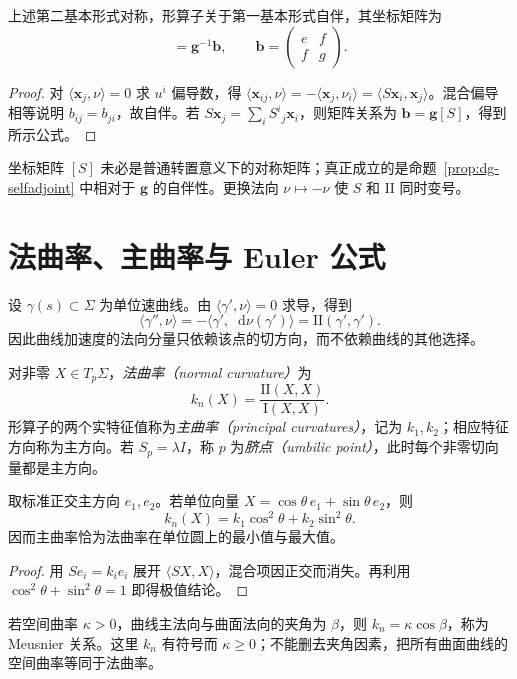 \documentclass[UTF8,12pt,a4paper,fontset=fandol]{ctexbook}
\newcommand{\dd}{\mathop{}\!\mathrm d}
\newcommand{\ip}[2]{\langle #1,#2\rangle}
\begin{document}
\begin{proposition}[形算子的自伴性]
上述第二基本形式对称，形算子关于第一基本形式自伴，其坐标矩阵为
\begin{equation}
 [S]=\mathbf g^{-1}\mathbf b,\qquad
 \mathbf b=\begin{pmatrix}e&f\\f&g\end{pmatrix}.
 \label{eq:dg-shape-matrix}
\end{equation}
\end{proposition}
\begin{proof}
对 $\ip{\mathbf x_j}\nu=0$ 求 $u^i$ 偏导数，得 $\ip{\mathbf x_{ij}}\nu=-\ip{\mathbf x_j}{\nu_i}=\ip{S\mathbf x_i}{\mathbf x_j}$。混合偏导相等说明 $b_{ij}=b_{ji}$，故自伴。若 $S\mathbf x_j=\sum_iS^i{}_j\mathbf x_i$，则矩阵关系为 $\mathbf b=\mathbf g[S]$，得到所示公式。
\end{proof}
坐标矩阵 $[S]$ 未必是普通转置意义下的对称矩阵；真正成立的是命题~\ref{prop:dg-selfadjoint} 中相对于 $\mathbf g$ 的自伴性。更换法向 $\nu\mapsto-\nu$ 使 $S$ 和 $\mathrm{II}$ 同时变号。

\section{法曲率、主曲率与 Euler 公式}
设 $\gamma(s)\subset\Sigma$ 为单位速曲线。由 $\ip{\gamma'}\nu=0$ 求导，得到
\[
 \ip{\gamma''}\nu=-\ip{\gamma'}{\dd\nu(\gamma')}
 =\mathrm{II}(\gamma',\gamma').
\]
因此曲线加速度的法向分量只依赖该点的切方向，而不依赖曲线的其他选择。

\begin{definition}[法曲率与主曲率]
对非零 $X\in T_p\Sigma$，\emph{法曲率（normal curvature）}为
\[
 k_n(X)=\frac{\mathrm{II}(X,X)}{\mathrm I(X,X)}.
\]
形算子的两个实特征值称为\emph{主曲率（principal curvatures）}，记为 $k_1,k_2$；相应特征方向称为主方向。若 $S_p=\lambda I$，称 $p$ 为\emph{脐点（umbilic point）}，此时每个非零切向量都是主方向。
\end{definition}

\begin{theorem}
取标准正交主方向 $e_1,e_2$。若单位向量 $X=\cos\theta\,e_1+\sin\theta\,e_2$，则
\begin{equation}
 k_n(X)=k_1\cos^2\theta+k_2\sin^2\theta.
 \label{eq:dg-euler-curvature}
\end{equation}
因而主曲率恰为法曲率在单位圆上的最小值与最大值。
\end{theorem}
\begin{proof}
用 $Se_i=k_ie_i$ 展开 $\ip{SX}{X}$，混合项因正交而消失。再利用 $\cos^2\theta+\sin^2\theta=1$ 即得极值结论。
\end{proof}
若空间曲率 $\kappa>0$，曲线主法向与曲面法向的夹角为 $\beta$，则 $k_n=\kappa\cos\beta$，称为 Meusnier 关系。这里 $k_n$ 有符号而 $\kappa\ge0$；不能删去夹角因素，把所有曲面曲线的空间曲率等同于法曲率。
\end{document}

